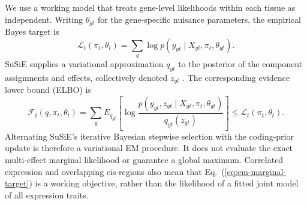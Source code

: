 \documentclass[12pt]{article}
\begin{document}
We use a working model that treats gene-level likelihoods within each
tissue as independent. Writing $\theta_{gt}$ for the gene-specific
nuisance parameters, the empirical Bayes target is
\begin{equation}
 \mathcal{L}_t(\pi_t,\theta_t)
 =\sum_g\log p(y_{gt}\mid X_{gt},\pi_t,\theta_{gt}).
 \label{eq:em-marginal-target}
\end{equation}
SuSiE supplies a variational approximation $q_{gt}$ to the posterior of
the component assignments and effects, collectively denoted $z_{gt}$
\cite{wang_simple_2020}. The corresponding evidence lower bound (ELBO) is
\begin{equation}
 \mathcal{F}_t(q,\pi_t,\theta_t)
 =\sum_g E_{q_{gt}}\left[
 \log\frac{p(y_{gt},z_{gt}\mid X_{gt},\pi_t,\theta_{gt})}
 {q_{gt}(z_{gt})}\right]
 \leq\mathcal{L}_t(\pi_t,\theta_t).
 \label{eq:em-elbo}
\end{equation}
Alternating SuSiE's iterative Bayesian stepwise selection with the
coding-prior update is therefore a variational EM procedure. It does not
evaluate the exact multi-effect marginal likelihood or guarantee a
global maximum. Correlated expression and overlapping cis-regions also
mean that Eq.~(\ref{eq:em-marginal-target}) is a working objective, rather
than the likelihood of a fitted joint model of all expression traits.
\end{document}
